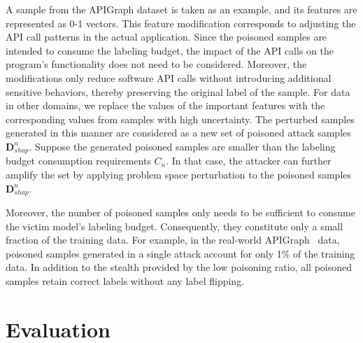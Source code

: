 \documentclass[conference,compsoc]{IEEEtran} %
\begin{document}
A sample from the APIGraph dataset is taken as an example, and its features are represented as 0-1 vectors.
This feature modification corresponds to adjusting the API call patterns in the actual application.
Since the poisoned samples are intended to consume the labeling budget, the impact of the API calls on the program's functionality does not need to be considered.
Moreover, the modifications only reduce software API calls without introducing additional sensitive behaviors, thereby preserving the original label of the sample.
For data in other domains, we replace the values of the important features with the corresponding values from samples with high uncertainty.
The perturbed samples generated in this manner are considered as a new set of poisoned attack samples $\bm{D}_{shap}^{n}$.
Suppose the generated poisoned samples are smaller than the labeling budget consumption requirements $C_{n}$. 
In that case, the attacker can further amplify the set by applying problem space perturbation to the poisoned samples $\bm{D}_{shap}^{n}$.

Moreover, the number of poisoned samples only needs to be sufficient to consume the victim model's labeling budget. 
Consequently, they constitute only a small fraction of the training data.
For example, in the real-world APIGraph~\cite{2020-CCS-APIGraph} data, poisoned samples generated in a single attack account for only 1\% of the training data.
In addition to the stealth provided by the low poisoning ratio, all poisoned samples retain correct labels without any label flipping.

		\section{Evaluation}
\label{Sec: Evaluation}
\end{document}
